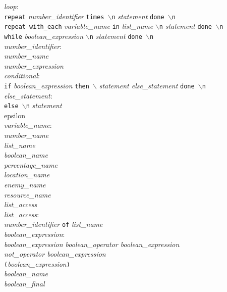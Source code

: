 \documentclass[a4paper]{article}
\begin{document}
\noindent\textit{loop}:\\
\indent\texttt{repeat} \textit{number\_identifier} \texttt{times $\backslash$n} \textit{statement} \texttt{done $\backslash$n}\\
\indent\texttt{repeat with\_each} \textit{variable\_name} \texttt{in} \textit{list\_name} \texttt{$\backslash$n} \textit{statement} \texttt{done $\backslash$n}\\
\indent\texttt{while} \textit{boolean\_expression} \texttt{$\backslash$n} \textit{statement} \texttt{done $\backslash$n}\\

\noindent\textit{number\_identifier}:\\
\indent\textit{number\_name}\\
\indent\textit{number\_expression}\\

\noindent\textit{conditional}:\\
\indent\texttt{if} \textit{boolean\_expression} \texttt{then $\backslash$} \textit{statement else\_statement} \texttt{done $\backslash$n}\\

\noindent\textit{else\_statement}:\\
\indent\texttt{else $\backslash$n} \textit{statement}\\
\indent epsilon\\

\noindent\textit{variable\_name}:\\
\indent\textit{number\_name}\\
\indent\textit{list\_name}\\
\indent\textit{boolean\_name}\\
\indent\textit{percentage\_name}\\
\indent\textit{location\_name}\\
\indent\textit{enemy\_name}\\
\indent\textit{resource\_name}\\
\indent\textit{list\_access}\\

\noindent\textit{list\_access}:\\
\indent\textit{number\_identifier} \texttt{of} \textit{list\_name}\\

\noindent\textit{boolean\_expression}:\\
\indent\textit{boolean\_expression boolean\_operator boolean\_expression}\\
\indent\textit{not\_operator boolean\_expression}\\
\indent \texttt{(}\textit{boolean\_expression}\texttt{)}\\
\indent\textit{boolean\_name}\\
\indent\textit{boolean\_final}\\
\end{document}
